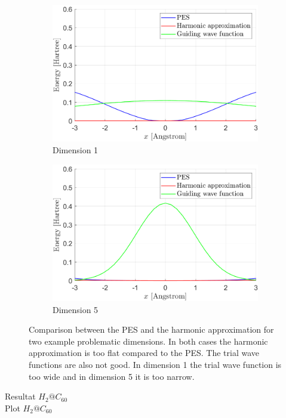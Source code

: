 \documentclass [12pt]{report}
\begin{document}
\begin{figure}[h]
\begin{subfigure}{0.5\textwidth}
\includegraphics[width=\linewidth]{walkers4.png} 
\caption{Dimension 1}
\label{dim1}
\end{subfigure}
\begin{subfigure}{0.5\textwidth}
\includegraphics[width=\linewidth]{walkers3.png}
\caption{Dimension 5}
\label{dim5}
\end{subfigure}
\caption{Comparison between the PES and the harmonic approximation for two example problematic dimensions. In both cases the harmonic approximation is too flat compared to the PES. The trial wave functions are also not good. In dimension 1 the trial wave function is too wide and in dimension 5 it is too narrow.}
\label{trialwf}
\end{figure}

Resultat $H_2@C_{60}$\\
Plot $H_2@C_{60}$
\end{document}
